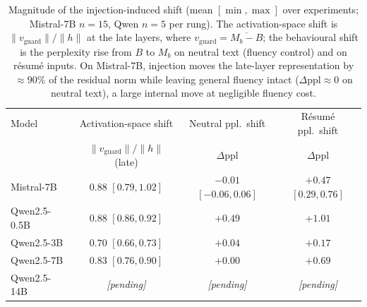 \begin{table}[t]
\centering
\small
\begin{tabular}{lccc}
\toprule
Model & Activation-space shift & Neutral ppl.\ shift & Résumé ppl.\ shift \\
      & $\lVert v_\mathrm{guard}\rVert/\lVert h\rVert$ (late) & $\Delta\text{ppl}$ & $\Delta\text{ppl}$ \\
\midrule
Mistral-7B    & $0.88$ $[0.79, 1.02]$ & $-0.01$ $[-0.06, 0.06]$ & $+0.47$ $[0.29, 0.76]$ \\
\midrule
Qwen2.5-0.5B  & $0.88$ $[0.86, 0.92]$ & $+0.49$ & $+1.01$ \\
Qwen2.5-3B    & $0.70$ $[0.66, 0.73]$ & $+0.04$ & $+0.17$ \\
Qwen2.5-7B    & $0.83$ $[0.76, 0.90]$ & $+0.00$ & $+0.69$ \\
Qwen2.5-14B   & \emph{[pending]} & \emph{[pending]} & \emph{[pending]} \\
\bottomrule
\end{tabular}
\caption{Magnitude of the injection-induced shift (mean $[\min, \max]$ over experiments;
Mistral-7B $n{=}15$, Qwen $n{=}5$ per rung). The activation-space shift is
$\lVert v_\mathrm{guard}\rVert/\lVert h\rVert$ at the late layers, where
$v_\mathrm{guard} = \overline{M_b - B}$; the behavioural shift is the perplexity rise from
$B$ to $M_b$ on neutral text (fluency control) and on résumé inputs. On Mistral-7B,
injection moves the late-layer representation by $\approx90\%$ of the residual norm while
leaving general fluency intact ($\Delta\text{ppl}\approx0$ on neutral text), a large
internal move at negligible fluency cost.}
\label{tab:dist-shift-mag}
\end{table}
